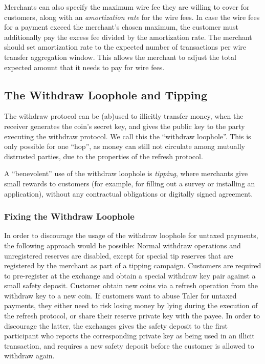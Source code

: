 Merchants can also specify the maximum wire fee they are willing to cover for
customers, along with an \emph{amortization rate} for the wire fees.  In case
the wire fees for a payment exceed the merchant's chosen maximum, the customer
must additionally pay the excess fee divided by the amortization rate.  The
merchant should set amortization rate to the expected number of transactions
per wire transfer aggregation window.  This allows the merchant to adjust
the total expected amount that it needs to pay for wire fees.


\subsection{The Withdraw Loophole and Tipping}\label{taler:design:tipping}

The withdraw protocol can be (ab)used to illicitly transfer money, when the
receiver generates the coin's secret key, and gives the public key to the party
executing the withdraw protocol.  We call this the ``withdraw loophole''.  This
is only possible for one ``hop'', as money can still not circulate among
mutually distrusted parties, due to the properties of the refresh protocol.

A ``benevolent'' use of the withdraw loophole is \emph{tipping}, where merchants give
small rewards to customers (for example, for filling out a survey or installing
an application), without any contractual obligations or digitally signed
agreement.


\subsubsection{Fixing the Withdraw Loophole}\label{taler:design:fixing-withdraw-loophole}

In order to discourage the usage of the withdraw loophole for untaxed payments,
the following approach would be possible:  Normal withdraw operations and
unregistered reserves are disabled, except for special tip reserves that are
registered by the merchant as part of a tipping campaign.  Customers are
required to pre-register at the exchange and obtain a special withdraw key pair
against a small safety deposit.  Customer obtain new coins via a refresh
operation from the withdraw key to a new coin.  If customers want to abuse
Taler for untaxed payments, they either need to risk losing money by lying
during the execution of the refresh protocol, or share their reserve private
key with the payee.  In order to discourage the latter, the exchanges gives the
safety deposit to the first participant who reports the corresponding private
key as being used in an illicit transaction, and requires a new safety deposit
before the customer is allowed to withdraw again.

